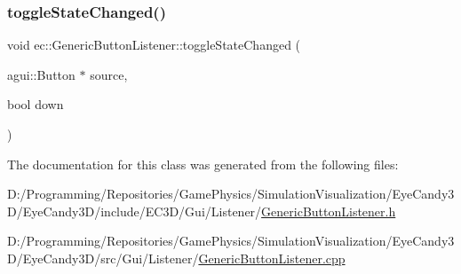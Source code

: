 \subsubsection{\texorpdfstring{toggle\+State\+Changed()}{toggleStateChanged()}}
{\footnotesize\ttfamily void ec\+::\+Generic\+Button\+Listener\+::toggle\+State\+Changed (\begin{DoxyParamCaption}\item[{agui\+::\+Button $\ast$}]{source,  }\item[{bool}]{down }\end{DoxyParamCaption})\hspace{0.3cm}{\ttfamily [override]}}



The documentation for this class was generated from the following files\+:\begin{DoxyCompactItemize}
\item 
D\+:/\+Programming/\+Repositories/\+Game\+Physics/\+Simulation\+Visualization/\+Eye\+Candy3\+D/\+Eye\+Candy3\+D/include/\+E\+C3\+D/\+Gui/\+Listener/\mbox{\hyperlink{_generic_button_listener_8h}{Generic\+Button\+Listener.\+h}}\item 
D\+:/\+Programming/\+Repositories/\+Game\+Physics/\+Simulation\+Visualization/\+Eye\+Candy3\+D/\+Eye\+Candy3\+D/src/\+Gui/\+Listener/\mbox{\hyperlink{_generic_button_listener_8cpp}{Generic\+Button\+Listener.\+cpp}}\end{DoxyCompactItemize}
